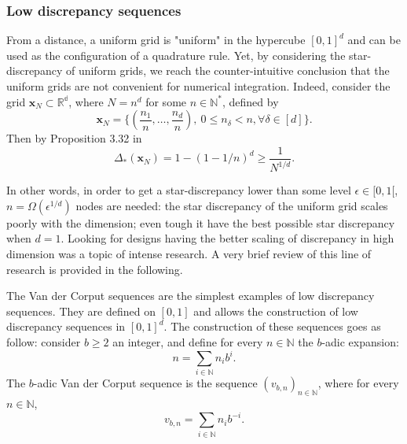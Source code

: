 \documentclass[twoside,11pt]{book}
\begin{document}


\subsubsection{Low discrepancy sequences}


From a distance, a uniform grid is "uniform" in the hypercube $[0,1]^{d}$ and can be used as the configuration of a quadrature rule. Yet, by considering the star-discrepancy of uniform grids, we reach the counter-intuitive conclusion that the uniform grids are not convenient for numerical integration. Indeed, consider the grid $\bm{x}_{N}  \subset \mathbb{R^{d}}$, where $N = n^{d}$ for some $n \in \mathbb{N}^{*}$, defined by
\begin{equation}
\bm{x}_{N} = \bigg\{ (\frac{n_{1}}{n}, \dots, \frac{n_{d}}{n}), \: 0 \leq n_{\delta} < n, \forall \delta \in [d] \bigg\}. 
\end{equation}
Then by Proposition 3.32 in \citep{DiPi10}
\begin{equation}
\Delta_{*}(\bm{x}_{N}) = 1- (1-1/n)^{d} \geq \frac{1}{N^{1/d}}. 
\end{equation} 


In other words, in order to get a star-discrepancy lower than some level $\epsilon \in [0,1[$, $n = \Omega(\epsilon^{1/d})$ nodes are needed: the star discrepancy of the uniform grid scales poorly with the dimension; even tough it have the best possible star discrepancy when $d = 1$.  Looking for designs having the better scaling of discrepancy in high dimension was a topic of intense research.  A very brief review of this line of research is provided in the following. 
 

The Van der Corput sequences are the simplest examples of low discrepancy sequences. They are defined on $[0,1]$ and allows the construction of low discrepancy sequences in $[0,1]^{d}$.
The construction of these sequences goes as follow: consider $b \geq 2$ an integer, and define for every $n \in \mathbb{N}$ the $b$-adic expansion:
\begin{equation}
n = \sum\limits_{i \in \mathbb{N}} n_{i}b^{i}.
\end{equation} 
The $b$-adic Van der Corput sequence is the sequence $(v_{b,n})_{n \in \mathbb{N}}$, where for every $n \in \mathbb{N}$, 
\begin{equation}
v_{b,n} = \sum\limits_{i \in \mathbb{N}} n_{i}b^{-i}. 
\end{equation}
\end{document}
